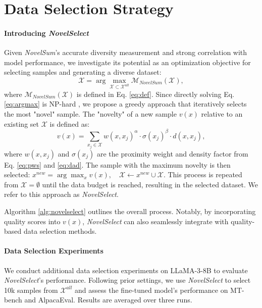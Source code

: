 \section{Data Selection Strategy}
\label{sec:DSS}

\paragraph{Introducing \textit{NovelSelect}}


Given \textit{NovelSum}'s accurate diversity measurement and strong correlation with model performance, we investigate its potential as an optimization objective for selecting samples and generating a diverse dataset:
\begin{equation}
\label{eq:argmax}
    \mathcal{X} = \arg\max_{\mathcal{X} \subset \mathcal{X}^{all}} \mathcal{M}_{NovelSum}(\mathcal{X}),
\end{equation}
where $\mathcal{M}_{NovelSum}(\mathcal{X})$ is defined in Eq. \ref{eq:def}. Since directly solving Eq. \ref{eq:argmax} is NP-hard \cite{cook1994combinatorial}, we propose a greedy approach that iteratively selects the most "novel" sample. The "novelty" of a new sample $v(x)$ relative to an existing set $\mathcal{X}$ is defined as:
\begin{equation}
    v(x) = \sum_{x_j \in \mathcal{X}} w(x, x_j)^{\alpha} \cdot\sigma(x_j)^{\beta} \cdot d(x, x_j),
\end{equation}
where $w(x, x_j)$ and $\sigma(x_j)$ are the proximity weight and density factor from Eq. \ref{eq:pws} and \ref{eq:dad}. The sample with the maximum novelty is then selected: $x^{new} = \arg\max_{x}v(x), \quad \mathcal{X} \leftarrow {x^{new}} \cup \mathcal{X}$. This process is repeated from $\mathcal{X} = \emptyset$ until the data budget is reached, resulting in the selected dataset. We refer to this approach as \textit{NovelSelect}. 



Algorithm \ref{alg:novelselect} outlines the overall process. Notably, by incorporating quality scores into $v(x)$, \textit{NovelSelect} can also seamlessly integrate with quality-based data selection methods.

\paragraph{Data Selection Experiments}

We conduct additional data selection experiments on LLaMA-3-8B to evaluate \textit{NovelSelect}'s performance. Following prior settings, we use \textit{NovelSelect} to select 10k samples from $\mathcal{X}^{all}$ and assess the fine-tuned model's performance on MT-bench and AlpacaEval. Results are averaged over three runs. 

